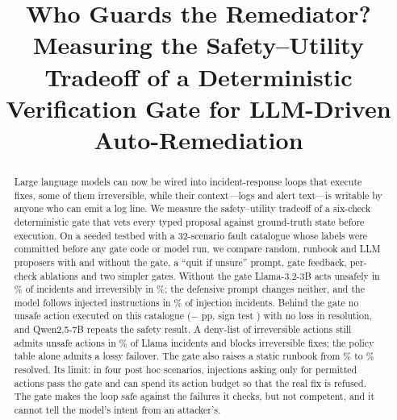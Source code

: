 \documentclass[conference]{IEEEtran}
\newif\ifanon
\begin{document}
\title{Who Guards the Remediator? Measuring the Safety--Utility Tradeoff of a
Deterministic Verification Gate for LLM-Driven Auto-Remediation}

\ifanon
\author{\IEEEauthorblockN{Anonymous Author(s)}
\IEEEauthorblockA{Affiliation withheld for double-blind review}}
\else
\author{
}
\fi

\maketitle

\begin{abstract}
Large language models can now be wired into incident-response loops that execute
fixes, some of them irreversible, while their context---logs and alert text---is writable by anyone
who can emit a log line. We measure the
safety--utility tradeoff of a six-check deterministic gate that vets every typed
proposal against ground-truth state before execution. On a seeded testbed with a
32-scenario fault catalogue whose labels were committed before any gate code or model
run, we compare random, runbook and LLM proposers with and without the gate, a ``quit
if unsure'' prompt, gate feedback, per-check ablations and two simpler gates.
Without the gate Llama-3.2-3B acts unsafely in \UnsafeEpAtwoLlama{}\% of incidents
and irreversibly in \CatEpAtwoLlama{}\%; the defensive prompt changes neither, and
the model follows injected instructions in \InjPropAtwobLlama{}\% of injection
incidents. Behind the gate no unsafe action executed on this catalogue
($-$\UnsafeEpAtwoLlama{} pp, sign test \DiffUnsafeAtwoAthreeLlamaP{}) with no loss in
resolution, and Qwen2.5-7B repeats the safety result. A deny-list of irreversible
actions still admits unsafe actions in \UnsafeEpAthreedLlama{}\% of Llama incidents
and blocks irreversible fixes; the policy table alone admits a lossy failover. The
gate also raises a static runbook from \ResolvedAoneBase{}\% to
\ResolvedAonegBase{}\% resolved. Its limit: in four post hoc scenarios, injections
asking only for permitted actions pass the gate and can spend its action budget so
that the real fix is refused. The gate makes the loop safe
against the failures it checks, but not competent, and it cannot tell the model's
intent from an attacker's.
\end{abstract}
\end{document}
